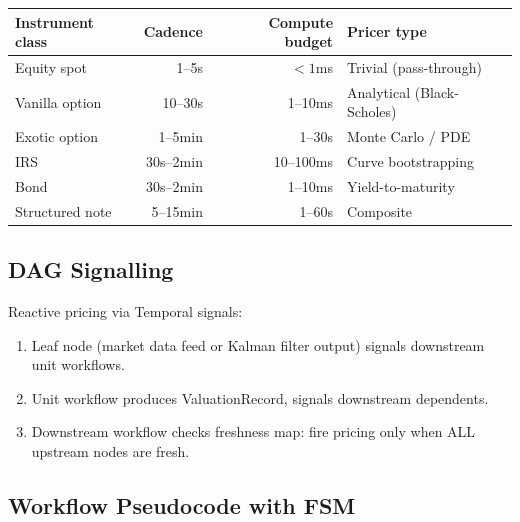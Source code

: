 \documentclass[11pt,a4paper]{article}
\begin{document}
\begin{center}
\small
\begin{tabular}{l r r l}
\toprule
\textbf{Instrument class} & \textbf{Cadence} & \textbf{Compute budget} & \textbf{Pricer type} \\
\midrule
Equity spot & 1--5s & $< 1$ms & Trivial (pass-through) \\
Vanilla option & 10--30s & 1--10ms & Analytical (Black-Scholes) \\
Exotic option & 1--5min & 1--30s & Monte Carlo / PDE \\
IRS & 30s--2min & 10--100ms & Curve bootstrapping \\
Bond & 30s--2min & 1--10ms & Yield-to-maturity \\
Structured note & 5--15min & 1--60s & Composite \\
\bottomrule
\end{tabular}
\end{center}

\subsection{DAG Signalling}

Reactive pricing via Temporal signals:
\begin{enumerate}[nosep]
\item Leaf node (market data feed or Kalman filter output) signals downstream unit workflows.
\item Unit workflow produces ValuationRecord, signals downstream dependents.
\item Downstream workflow checks freshness map: fire pricing only when ALL upstream nodes are fresh.
\end{enumerate}

\subsection{Workflow Pseudocode with FSM}
\end{document}
